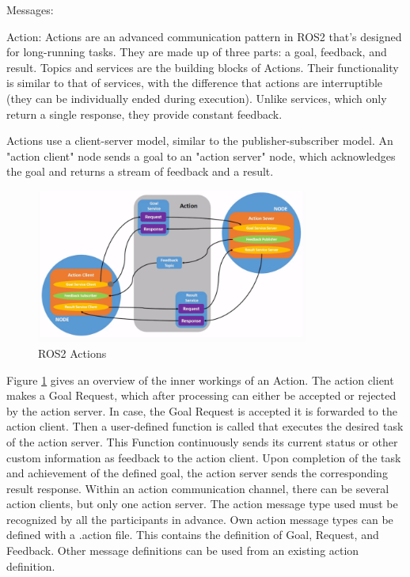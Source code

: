 \begin{labeling}{Messages:}
		\item [Action:]
		Actions are an advanced communication pattern in ROS2 that's designed for long-running tasks. They are made up of three parts: a goal, feedback, and result.
		Topics and services are the building blocks of Actions. Their functionality is similar to that of services, with the difference that actions are interruptible (they can be individually ended during execution). Unlike services, which only return a single response, they provide constant feedback.
		
		Actions use a client-server model, similar to the publisher-subscriber model. An "action client" node sends a goal to an "action server" node, which acknowledges the goal and returns a stream of feedback and a result. 

		\begin{figure}[H]
			\centering
			\includegraphics[width=0.8\textwidth]{"Bilder/ros-actions.png"}
			\caption{ROS2 Actions \cite{ros2Tutorials}}
			\label{fig:Background:Ros2Actions}					
		\end{figure}

		Figure \ref{fig:Background:Ros2Actions} gives an overview of the inner workings of an Action. The action client makes a Goal Request, which after processing can either be accepted or rejected by the action server. In case, the Goal Request is accepted it is forwarded to the action client. Then a user-defined function is called that executes the desired task of the action server. This Function continuously sends its current status or other custom information as feedback to the action client. Upon completion of the task and achievement of the defined goal, the action server sends the corresponding result response. Within an action communication channel, there can be several action clients, but only one action server. The action message type used must be recognized by all the participants in advance. Own action message types can be defined with a .action file. This contains the definition of Goal, Request, and Feedback. Other message definitions can be used from an existing action definition.		
		
	\end{labeling}

